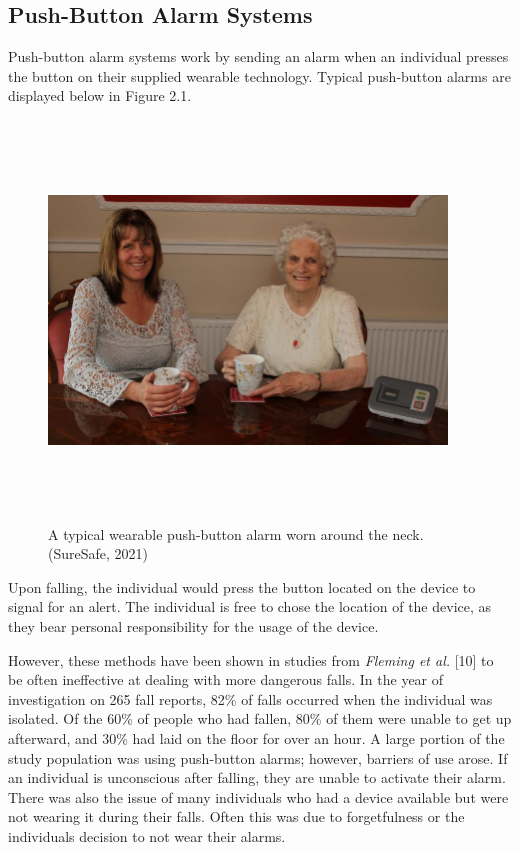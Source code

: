 \subsection{Push-Button Alarm Systems}
Push-button alarm systems work by sending an alarm when an individual presses the button on their supplied wearable technology. Typical push-button alarms are displayed below in Figure 2.1.\\

\begin{figure}[htp]
    \centering
    \includegraphics[width=400px,height=400px,keepaspectratio]{wearable-sensor.jpg}
    \vspace{-2ex}%
    \caption{A typical wearable push-button alarm worn around the neck. (SureSafe, 2021)}
    \label{fig:my_label}
\end{figure}

Upon falling, the individual would press the button located on the device to signal for an alert. The individual is free to chose the location of the device, as they bear personal responsibility for the usage of the device.

However, these methods have been shown in studies from \textit{Fleming et al.} [10] to be often ineffective at dealing with more dangerous falls. In the year of investigation on 265 fall reports, 82\% of falls occurred when the individual was isolated. Of the 60\% of people who had fallen, 80\% of them were unable to get up afterward, and 30\% had laid on the floor for over an hour. A large portion of the study population was using push-button alarms; however, barriers of use arose. If an individual is unconscious after falling, they are unable to activate their alarm. There was also the issue of many individuals who had a device available but were not wearing it during their falls. Often this was due to forgetfulness or the individuals decision to not wear their alarms.


